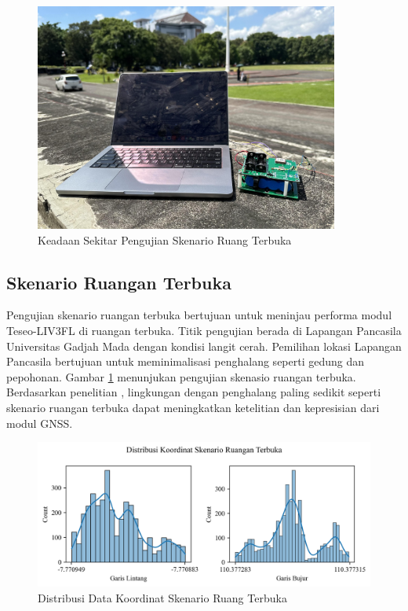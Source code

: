 \begin{figure}[H]
	\centering
	\includegraphics[width=10cm]{contents/chapter-4/4-skenario-outdoor/keadaan.jpg}
	\caption{Keadaan Sekitar Pengujian Skenario Ruang Terbuka}
	\label{Fig: outdoor-keadaan}
\end{figure}

\subsection{Skenario Ruangan Terbuka}
Pengujian skenario ruangan terbuka bertujuan untuk meninjau performa modul Teseo-LIV3FL di ruangan terbuka. Titik pengujian berada di Lapangan Pancasila Universitas Gadjah Mada dengan kondisi langit cerah. Pemilihan lokasi Lapangan Pancasila bertujuan untuk meminimalisasi penghalang seperti gedung dan pepohonan. Gambar \ref{Fig: outdoor-keadaan} menunjukan pengujian skenasio ruangan terbuka. Berdasarkan penelitian \cite{Lu2018}, lingkungan dengan penghalang paling sedikit seperti skenario ruangan terbuka dapat meningkatkan ketelitian dan kepresisian dari modul GNSS.

\begin{figure}[H]
	\centering
	\begin{adjustbox}{width=\textwidth}
		\includegraphics{contents/chapter-4/4-skenario-outdoor/distribution.png}
	\end{adjustbox}
	\caption{Distribusi Data Koordinat Skenario Ruang Terbuka}
	\label{Fig:outdoor-distribution}
\end{figure}

